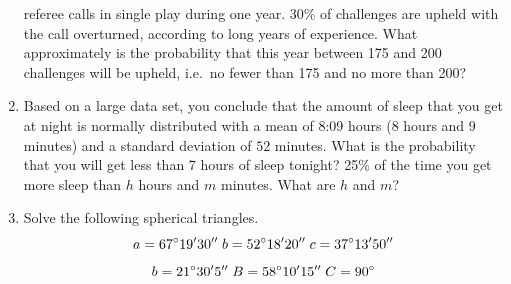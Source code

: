 \documentclass[11pt]{article}
\begin{document}
\begin{enumerate}
  referee calls in single play during one year. 30\% of challenges are
  upheld with the call overturned, according to long years of
  experience. What approximately is the probability that this year
  between 175 and 200 challenges will be upheld, i.e.\ no fewer than
  175 and no more than 200?
\item Based on a large data set, you conclude that the amount of sleep
  that you get at night is normally distributed with a mean of 8:09
  hours (8 hours and 9 minutes) and a standard deviation of $52$
  minutes. What is the probability that you will get less than 7 hours
  of sleep tonight? 25\% of the time you get more sleep than $h$ hours
  and $m$ minutes. What are $h$ and $m$?
 \item Solve the following spherical triangles.
   \begin{equation}
     \label{eq:isotufie}
     a=67^{\circ}19'30''\;{}b=52^{\circ}18'20''\;{}c=37^{\circ}13'50''\notag
   \end{equation}
   \begin{equation}
     \label{eq:eizokaih}
     b=21^{\circ}30'5''\;{}B=58^{\circ}10'15''\;{}C=90^{\circ}\notag
   \end{equation}
\end{enumerate}
\end{document}
